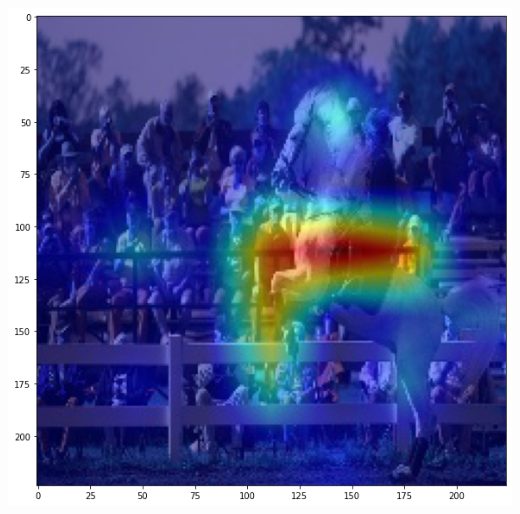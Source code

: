 \documentclass[10pt,twocolumn,letterpaper]{article}
\begin{document}
\includegraphics[width=0.8\linewidth]{docs/latex/images/brandon/gradcam_large_swin_patch4_window7_224_in22k.png}
\end{document}
